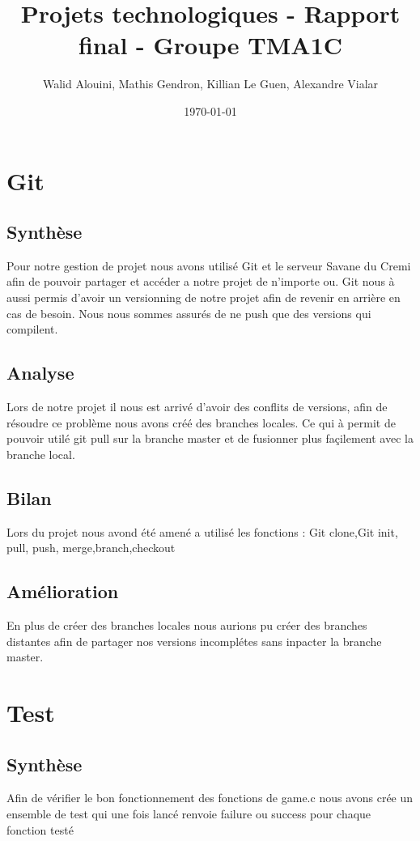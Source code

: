 \documentclass[12pt]{article}
\begin{document}
\title{Projets technologiques - Rapport final - Groupe TMA1C}
\author{Walid Alouini, Mathis Gendron, Killian Le Guen, Alexandre Vialar}
\date{\today}

\maketitle
\tableofcontents

\section{Git}
\subsection{Synthèse}
Pour notre gestion de projet nous avons utilisé Git et le serveur Savane du Cremi afin de pouvoir partager et accéder a notre projet de n'importe ou.
Git nous à aussi permis d'avoir un versionning de notre projet afin de revenir en arrière en cas de besoin.
Nous nous sommes assurés de ne push que des versions qui compilent.
\subsection{Analyse}
Lors de notre projet il nous est arrivé d'avoir des conflits de versions, afin de résoudre ce problème nous avons créé des branches locales. 
Ce qui à permit de pouvoir utilé git pull sur la branche master et de fusionner plus façilement avec la branche local.
\subsection{Bilan}
Lors du projet nous avond été amené a utilisé les fonctions : Git clone,Git init, pull, push, merge,branch,checkout
\subsection{Amélioration}
En plus de créer des branches locales nous aurions pu créer des branches distantes afin de partager nos versions incomplétes sans inpacter la branche master.

\section{Test}
\subsection{Synthèse}
Afin de vérifier le bon fonctionnement des fonctions de game.c nous avons crée un ensemble de test qui une fois lancé renvoie failure ou success 
pour chaque fonction testé
\end{document}
